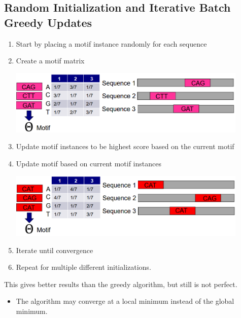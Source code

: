 \documentclass[10pt]{article}
\begin{document}
\subsection*{Random Initialization and Iterative Batch Greedy Updates}
\begin{enumerate}
	\item Start by placing a motif instance randomly for each sequence
	\item Create a motif matrix
	\begin{center} 
        \includegraphics*[width=0.9\textwidth]{W7_24.png} 
    \end{center}
	\item Update motif instances to be highest score based on the current motif
	\item Update motif based on current motif instances
	\begin{center} 
        \includegraphics*[width=0.9\textwidth]{W7_25.png} 
    \end{center}
	\item Iterate until convergence
	\item Repeat for multiple different initializations.
\end{enumerate}
This gives better results than the greedy algorithm, but still is not perfect.
\begin{itemize}
	\item The algorithm may converge at a local minimum instead of the global minimum.
\end{itemize}
\end{document}
